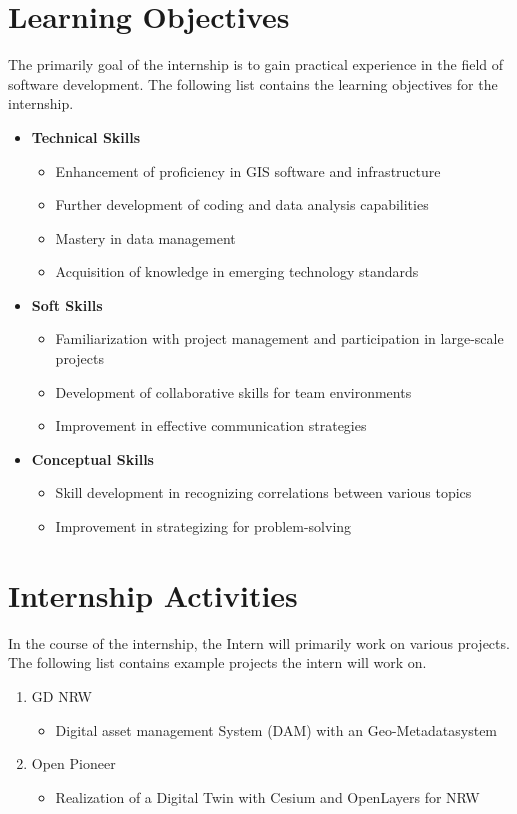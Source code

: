 \documentclass[11pt, titlepage, a4paper]{article}
\begin{document}
\section{Learning Objectives}
The primarily goal of the internship is to gain practical experience in the field of software development. The following list contains the learning objectives for the internship. 
\begin{itemize}
    \item \textbf{Technical Skills}
    \begin{itemize}
        \item Enhancement of proficiency in GIS software and infrastructure
        \item Further development of coding and data analysis capabilities
        \item Mastery in data management
        \item Acquisition of knowledge in emerging technology standards
    \end{itemize}
    \item \textbf{Soft Skills}
    \begin{itemize}
        \item Familiarization with project management and participation in large-scale projects
        \item Development of collaborative skills for team environments
        \item Improvement in effective communication strategies
    \end{itemize}
    \item \textbf{Conceptual Skills}
    \begin{itemize}
        \item Skill development in recognizing correlations between various topics
        \item Improvement in strategizing for problem-solving
    \end{itemize}
    \end{itemize}
    

\section{Internship Activities}
In the course of the internship, the Intern will primarily work on various projects. The following list contains example projects the intern will work on.

\begin{enumerate}
    \item GD NRW
    \begin{itemize}
        \item Digital asset management System (DAM) with an Geo-Metadatasystem
    \end{itemize}
    \item Open Pioneer
    \begin{itemize}
        \item Realization of a Digital Twin with Cesium and OpenLayers for NRW 
    \end{itemize}
    \end{enumerate}
\end{document}
